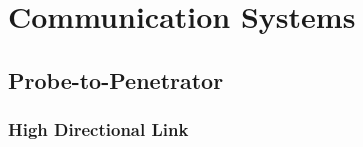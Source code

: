 \chapter{Communication Systems}








\section{Probe-to-Penetrator}

\subsection{High Directional Link}


